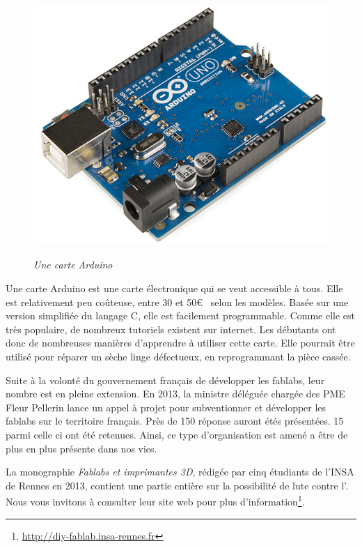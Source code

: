 \begin{figure}
\begin{center}
\vspace{-1cm}\includegraphics[scale=0.25]{Rsc/Arduino.png} 

\textit{Une carte Arduino}
\end{center}
\end{figure}

Une carte Arduino est une carte électronique qui se veut accessible à tous. Elle est relativement peu coûteuse, entre 30 et 50\euro~ selon les modèles. Basée sur une version simplifiée du langage C, elle est facilement programmable. Comme elle est très populaire, de nombreux tutoriels existent sur internet. Les débutants ont donc de nombreuses manières d'apprendre à utiliser cette carte. Elle pourrait être utilisé pour réparer un sèche linge défectueux, en reprogrammant la pièce cassée.

\medbreak

Suite à la volonté du gouvernement français de développer les fablabs, leur nombre est en pleine extension. En 2013, la ministre déléguée chargée des PME Fleur Pellerin lance un appel à projet pour subventionner et développer les fablabs sur le territoire français. Près de 150 réponse auront étés présentées. 15 parmi celle ci ont été retenues. Ainsi,  ce type d'organisation est amené a être de plus en plus présente dans nos vies. 

La monographie \textit{Fablabs et imprimantes 3D}, rédigée par cinq étudiants de l'INSA de Rennes en 2013, contient une partie entière sur la possibilité de lute contre l'\op. Nous vous invitons à consulter leur site web pour plus d'information\footnote{\url{http://diy-fablab.insa-rennes.fr}}.


